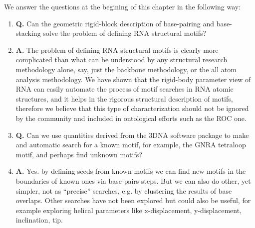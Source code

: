 We  answer  the questions  at  the begining  of  this  chapter in  the
following way:

\begin{enumerate}
\item{\textbf{Q.}  Can   the  geometric  rigid-block   description  of
  base-pairing  and base-stacking  solve the  problem of  defining RNA
  structural motifs?}
\item{\textbf{A.}  The  problem of  defining RNA structural  motifs is
  clearly  more  complicated  than  what  can  be  understood  by  any
  structural  research  methodology  alone,  say,  just  the  backbone
  methodology, or  the all atom  analysis methodology.  We  have shown
  that the  rigid-body parameter view  of RNA can easily  automate the
  process of motif searches in  RNA atomic structures, and it helps in
  the rigorous structural description  of motifs, therefore we believe
  that  this type  of characterization  should not  be ignored  by the
  community and included in ontological efforts such as the ROC one.}
\item{\textbf{Q.} Can we use quantities derived from the 3DNA software
  package to make and automatic search for a known motif, for example,
  the GNRA tetraloop motif, and perhaps find unknown motifs?}
\item{\textbf{A.} Yes. by defining seeds from known motifs we can find
new motifs in  the boundaries of known ones  via base-pairs steps. But
we  can also  do  other,  yet simpler,  not  as ``precise''  searches,
e.g. by clustering  the results of base overlaps.  Other searches have
not  been explored  but could  also be  useful, for  example exploring
helical  parameters like x-displacement,  y-displacement, inclination,
tip.} 
\end{enumerate}



